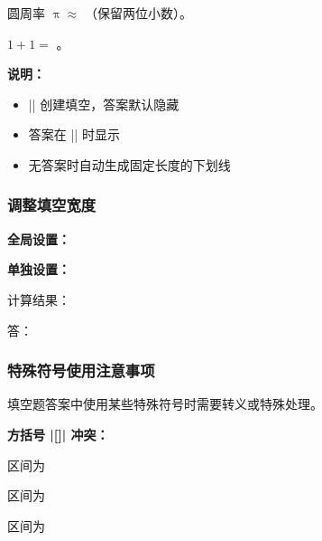 \begin{latexcode}
  \begin{question}
    圆周率 $\uppi \approx$ \fillin[3.14]（保留两位小数）。
  \end{question}

  \begin{question}
    $1 + 1 = $ \fillin[2]。
  \end{question}
\end{latexcode}

\textbf{说明：}
\begin{itemize}
  \item |\fillin[答案]| 创建填空，答案默认隐藏
  \item 答案在 || 时显示
  \item 无答案时自动生成固定长度的下划线
\end{itemize}

\subsubsection{调整填空宽度}

\textbf{全局设置：}

\begin{latexcode}
\end{latexcode}

\textbf{单独设置：}

\begin{latexcode}
  计算结果：\fillin[width = 8em][很长的答案内容]

  答：\fillin[width = 2em][是]
\end{latexcode}

\subsubsection{特殊符号使用注意事项}

填空题答案中使用某些特殊符号时需要转义或特殊处理。

\textbf{方括号 |[]| 冲突：}

\begin{latexcode}
  区间为 \fillin[[2,3)]

  区间为 \fillin[{$[2,3)$}]

  区间为 \fillin*{$[2,3)$}
\end{latexcode}

